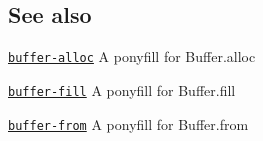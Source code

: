 \subsection*{See also}


\begin{DoxyItemize}
\item \href{https://github.com/LinusU/buffer-alloc}{\tt buffer-\/alloc} A ponyfill for {\ttfamily Buffer.\+alloc}
\item \href{https://github.com/LinusU/buffer-fill}{\tt buffer-\/fill} A ponyfill for {\ttfamily Buffer.\+fill}
\item \href{https://github.com/LinusU/buffer-from}{\tt buffer-\/from} A ponyfill for {\ttfamily Buffer.\+from} 
\end{DoxyItemize}